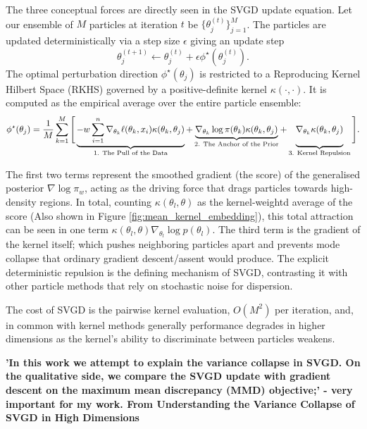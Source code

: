 \documentclass[mstat,12pt]{unswthesis}
\newcommand{\add}[1]{{\color{red}#1}}
\begin{document}
The three conceptual forces are directly seen in the SVGD update equation. Let our ensemble of $M$ particles at iteration $t$ be $\{\theta_j^{(t)}\}_{j=1}^M$. The particles are updated deterministically via a step size $\epsilon$ giving an update step
\begin{equation}
    \theta_j^{(t+1)} \leftarrow \theta_j^{(t)} + \epsilon  \phi^\star(\theta_j^{(t)}).
\end{equation}
The optimal perturbation direction $\phi^\star(\theta_j)$ is restricted to a Reproducing Kernel Hilbert Space (RKHS) governed by a positive-definite kernel $\kappa(\cdot, \cdot)$. It is computed as the empirical average over the entire particle ensemble:
\begin{equation}
    \phi^\star(\theta_j) = \frac{1}{M} \sum_{k=1}^M \Bigg[ \underbrace{- w \sum_{i=1}^n \nabla_{\theta_k} \ell(\theta_k, x_i)  \kappa(\theta_k, \theta_j)}_{\text{1. The Pull of the Data}} + \underbrace{\nabla_{\theta_k} \log \pi(\theta_k)  \kappa(\theta_k, \theta_j)}_{\text{2. The Anchor of the Prior}} + \underbrace{\vphantom{\sum_{i=1}^n} \nabla_{\theta_k} \kappa(\theta_k, \theta_j)}_{\text{3. Kernel Repulsion}} \Bigg].
\end{equation}

The first two terms represent the smoothed gradient (the score) of the generalised posterior $\nabla \log \pi_w$, acting as the driving force that drags particles towards high-density regions. In total, counting $\kappa(\theta_l, \theta)$ as the kernel-weightd average of the score (Also shown in Figure \ref{fig:mean_kernel_embedding}), this total attraction can be seen in one term $\kappa(\theta_l,\theta)\nabla_{\theta_l}\log p(\theta_l)$. The third term is the gradient of the kernel itself; which pushes neighboring particles apart and prevents mode collapse that ordinary gradient descent/assent would produce. \add{The explicit deterministic repulsion is the defining mechanism of SVGD, contrasting it with other particle methods that rely on stochastic noise for dispersion.}

The cost of SVGD is the pairwise kernel evaluation, $O(M^2)$ per iteration, and, in common with kernel methods generally performance degrades in higher dimensions as the kernel's ability to discriminate between particles weakens.


\textbf{\add{'In this work we attempt to explain the variance collapse in SVGD. On the qualitative side, we compare the SVGD update with gradient descent on the maximum mean discrepancy (MMD) objective;' - very important for my work. From  Understanding the Variance Collapse of SVGD in High Dimensions }}
\end{document}
